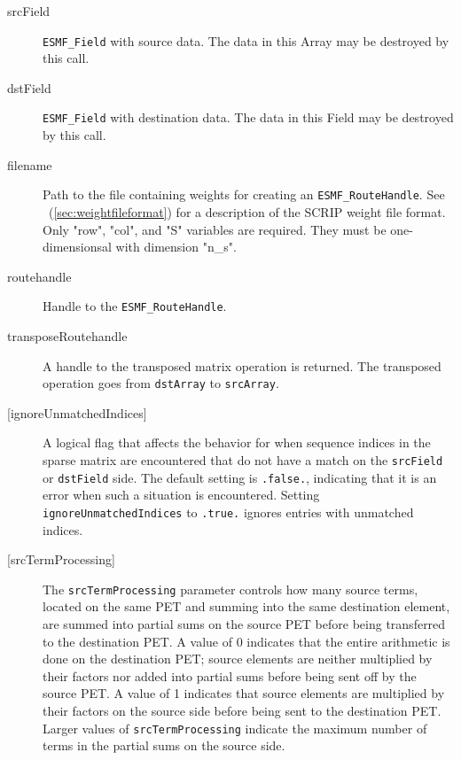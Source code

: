    \begin{description}
  
   \item [srcField]
         {\tt ESMF\_Field} with source data. The data in this Array may be
         destroyed by this call.
  
   \item [dstField]
         {\tt ESMF\_Field} with destination data. The data in this Field may be
         destroyed by this call.
  
   \item [filename]
         Path to the file containing weights for creating an {\tt ESMF\_RouteHandle}.
         See ~(\ref{sec:weightfileformat}) for a description of the SCRIP weight
         file format. Only "row", "col", and "S" variables are required. They
         must be one-dimensionsal with dimension "n\_s".
  
   \item [routehandle]
         Handle to the {\tt ESMF\_RouteHandle}.
  
   \item [transposeRoutehandle]
       A handle to the transposed matrix operation is returned. The
       transposed operation goes from {\tt dstArray} to {\tt srcArray}.
  
     \item [{[ignoreUnmatchedIndices]}]
       A logical flag that affects the behavior for when sequence indices
       in the sparse matrix are encountered that do not have a match on the
       {\tt srcField} or {\tt dstField} side. The default setting is
       {\tt .false.}, indicating that it is an error when such a situation is
       encountered. Setting {\tt ignoreUnmatchedIndices} to {\tt .true.} ignores
       entries with unmatched indices.
  
     \item [{[srcTermProcessing]}]
       The {\tt srcTermProcessing} parameter controls how many source terms,
       located on the same PET and summing into the same destination element,
       are summed into partial sums on the source PET before being transferred
       to the destination PET. A value of 0 indicates that the entire arithmetic
       is done on the destination PET; source elements are neither multiplied
       by their factors nor added into partial sums before being sent off by the
       source PET. A value of 1 indicates that source elements are multiplied
       by their factors on the source side before being sent to the destination
       PET. Larger values of {\tt srcTermProcessing} indicate the maximum number
       of terms in the partial sums on the source side.
  

\end{description}

